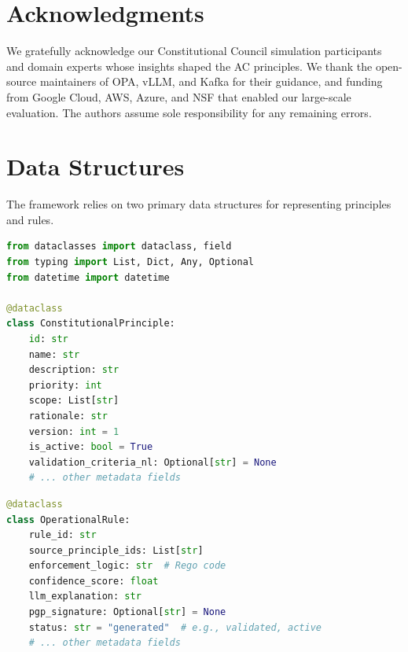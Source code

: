 \documentclass[10pt,twocolumn]{article}
\theoremstyle{definition}
\begin{document}
\section*{Acknowledgments}
We gratefully acknowledge our Constitutional Council simulation participants and domain experts whose insights shaped the AC principles. We thank the open-source maintainers of OPA, vLLM, and Kafka for their guidance, and funding from Google Cloud, AWS, Azure, and NSF that enabled our large-scale evaluation. The authors assume sole responsibility for any remaining errors.

{\small


}

\appendix

\section{Data Structures}
\label{sec:appendix_datastructures}
The framework relies on two primary data structures for representing principles and rules.

\begin{lstlisting}[language=Python, caption={Python dataclass for a Constitutional Principle.}, label={lst:constitutional_principle}]
from dataclasses import dataclass, field
from typing import List, Dict, Any, Optional
from datetime import datetime

@dataclass
class ConstitutionalPrinciple:
    id: str
    name: str
    description: str
    priority: int
    scope: List[str]
    rationale: str
    version: int = 1
    is_active: bool = True
    validation_criteria_nl: Optional[str] = None
    # ... other metadata fields
\end{lstlisting}

\begin{lstlisting}[language=Python, caption={Python dataclass for an Operational Rule.}, label={lst:operational_rule}]
@dataclass
class OperationalRule:
    rule_id: str
    source_principle_ids: List[str]
    enforcement_logic: str  # Rego code
    confidence_score: float
    llm_explanation: str
    pgp_signature: Optional[str] = None
    status: str = "generated"  # e.g., validated, active
    # ... other metadata fields
\end{lstlisting}
\end{document}
